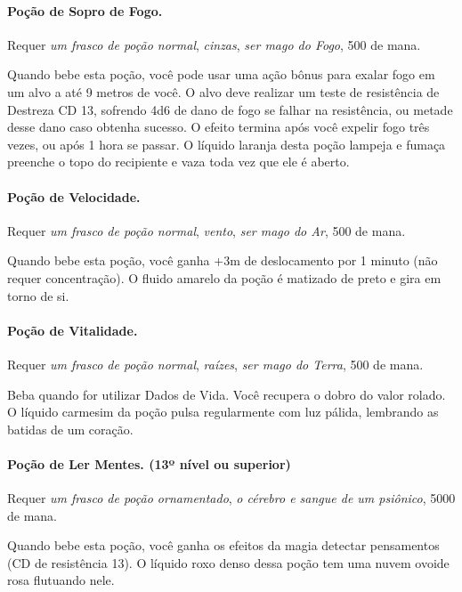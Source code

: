 \begin{multicols}{2}
\paragraph{Poção de Sopro de Fogo.}%

Requer \textit{um frasco de poção normal}, \textit{cinzas}, \textit{ser mago do
Fogo}, 500 de mana.

Quando bebe esta poção, você pode usar uma ação bônus para exalar fogo em um
alvo a até 9 metros de você. O alvo deve realizar um teste de resistência de
Destreza CD 13, sofrendo 4d6 de dano de fogo se falhar na resistência, ou metade
desse dano caso obtenha sucesso. O efeito termina após você expelir fogo três
vezes, ou após 1 hora se passar. O líquido laranja desta poção lampeja e fumaça
preenche o topo do recipiente e vaza toda vez que ele é aberto.

\paragraph{Poção de Velocidade.}%

Requer \textit{um frasco de poção normal}, \textit{vento}, \textit{ser mago do
Ar}, 500 de mana.

Quando bebe esta poção, você ganha +3m de deslocamento por 1 minuto (não requer
concentração). O fluido amarelo da poção é matizado de preto e gira em torno de
si.

\paragraph{Poção de Vitalidade.}%

Requer \textit{um frasco de poção normal}, \textit{raízes}, \textit{ser mago do
Terra}, 500 de mana.

Beba quando for utilizar Dados de Vida. Você recupera o dobro do valor rolado.
O líquido carmesim da poção pulsa regularmente com luz pálida, lembrando as
batidas de um coração.

\paragraph{Poção de Ler Mentes. (13º nível ou superior)}

Requer \textit{um frasco de poção ornamentado}, \textit{o cérebro e sangue de um
psiônico}, 5000 de mana.

Quando bebe esta poção, você ganha os efeitos da magia detectar pensamentos (CD
de resistência 13). O líquido roxo denso dessa poção tem uma nuvem ovoide rosa
flutuando nele.


\end{multicols}
